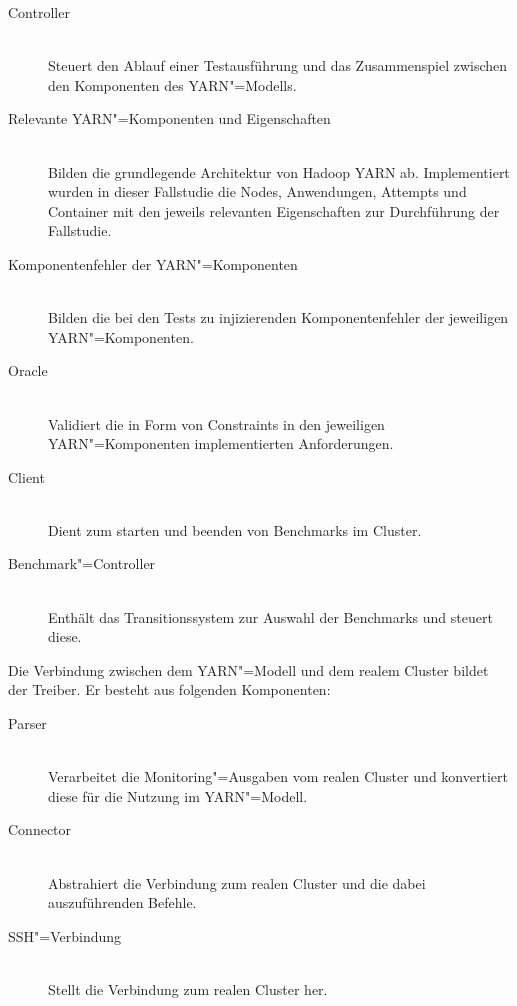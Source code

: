 \begin{description}
    \item [Controller] \hfill \\
        Steuert den Ablauf einer Testausführung und das Zusammenspiel zwischen den Komponenten des \gls{YARN}"=Modells.
    \item [Relevante \gls{YARN}"=Komponenten und Eigenschaften] \hfill \\
        Bilden die grundlegende Architektur von Hadoop \gls{YARN} ab.
        Implementiert wurden in dieser Fallstudie die Nodes, Anwendungen, \glspl{Attempt} und \gls{Container} mit den jeweils relevanten Eigenschaften zur Durchführung der Fallstudie.
    \item [Komponentenfehler der \gls{YARN}"=Komponenten] \hfill \\
        Bilden die bei den \glspl{Test} zu injizierenden Komponentenfehler der jeweiligen \gls{YARN}"=Komponenten.
    \item [Oracle] \hfill \\
        Validiert die in Form von Constraints in den jeweiligen \gls{YARN}"=Komponenten implementierten Anforderungen.
    \item [Client] \hfill \\
        Dient zum starten und beenden von Benchmarks im Cluster.
    \item [Benchmark"=Controller] \hfill \\
        Enthält das Transitionssystem zur Auswahl der Benchmarks und steuert diese.
\end{description}

Die Verbindung zwischen dem \gls{YARN}"=Modell und dem realem Cluster bildet der Treiber.
Er besteht aus folgenden Komponenten:

\begin{description}
    \item [Parser] \hfill \\
        Verarbeitet die Monitoring"=Ausgaben vom realen Cluster und konvertiert diese für die Nutzung im \gls{YARN}"=Modell.
    \item [Connector] \hfill \\
        Abstrahiert die Verbindung zum realen Cluster und die dabei auszuführenden Befehle.
    \item [SSH"=Verbindung]  \hfill \\
        Stellt die Verbindung zum realen Cluster her.
\end{description}

